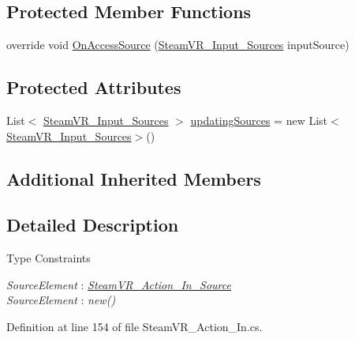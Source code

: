 \subsection*{Protected Member Functions}
\begin{DoxyCompactItemize}
\item 
override void \mbox{\hyperlink{class_valve_1_1_v_r_1_1_steam_v_r___action___in___source___map_aacbc05f0647705e1268c2bda304481a9}{On\+Access\+Source}} (\mbox{\hyperlink{namespace_valve_1_1_v_r_a82e5bf501cc3aa155444ee3f0662853f}{Steam\+V\+R\+\_\+\+Input\+\_\+\+Sources}} input\+Source)
\end{DoxyCompactItemize}
\subsection*{Protected Attributes}
\begin{DoxyCompactItemize}
\item 
List$<$ \mbox{\hyperlink{namespace_valve_1_1_v_r_a82e5bf501cc3aa155444ee3f0662853f}{Steam\+V\+R\+\_\+\+Input\+\_\+\+Sources}} $>$ \mbox{\hyperlink{class_valve_1_1_v_r_1_1_steam_v_r___action___in___source___map_a3a2ed7b8eab08eb669d835f676794927}{updating\+Sources}} = new List$<$\mbox{\hyperlink{namespace_valve_1_1_v_r_a82e5bf501cc3aa155444ee3f0662853f}{Steam\+V\+R\+\_\+\+Input\+\_\+\+Sources}}$>$()
\end{DoxyCompactItemize}
\subsection*{Additional Inherited Members}


\subsection{Detailed Description}
\begin{Desc}
\item[Type Constraints]\begin{description}
\item[{\em Source\+Element} : {\em \mbox{\hyperlink{class_valve_1_1_v_r_1_1_steam_v_r___action___in___source}{Steam\+V\+R\+\_\+\+Action\+\_\+\+In\+\_\+\+Source}}}]\item[{\em Source\+Element} : {\em new()}]\end{description}
\end{Desc}


Definition at line 154 of file Steam\+V\+R\+\_\+\+Action\+\_\+\+In.\+cs.



